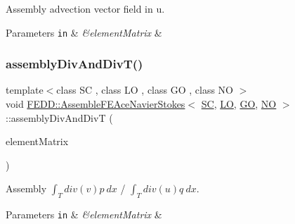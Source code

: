 Assembly advection vector field in u. 


\begin{DoxyParams}[1]{Parameters}
\mbox{\tt in}  & {\em \&element\+Matrix} & \\
\hline
\end{DoxyParams}
\mbox{\label{classFEDD_1_1AssembleFEAceNavierStokes_afec8907a0c90e42b5d0ceeb2509f3b31}} 
\subsubsection{\texorpdfstring{assembly\+Div\+And\+Div\+T()}{assemblyDivAndDivT()}}
{\footnotesize\ttfamily template$<$class SC , class LO , class GO , class NO $>$ \\
void \hyperlink{classFEDD_1_1AssembleFEAceNavierStokes}{F\+E\+D\+D\+::\+Assemble\+F\+E\+Ace\+Navier\+Stokes}$<$ \hyperlink{fe__test__laplace_8cpp_a79c7e86a57edbb2a5a53242bcd04e41e}{SC}, \hyperlink{fe__test__laplace_8cpp_ad6a38c9f07d3fd633eefca5bccad8410}{LO}, \hyperlink{fe__test__laplace_8cpp_afa2946b509009b4f45eb04bd8c5b27d9}{GO}, \hyperlink{fe__test__laplace_8cpp_a5e24f37b28787429872b6ecb1d0417ce}{NO} $>$\+::assembly\+Div\+And\+DivT (\begin{DoxyParamCaption}\item[{\hyperlink{classFEDD_1_1AssembleFE_afb5fb5dca3aab59f697a25884e99e894}{Small\+Matrix\+Ptr\+\_\+\+Type} \&}]{element\+Matrix }\end{DoxyParamCaption})\hspace{0.3cm}{\ttfamily [private]}}



Assembly $ \int_T div(v) p ~dx$ / $ \int_T div(u) q ~dx$. 


\begin{DoxyParams}[1]{Parameters}
\mbox{\tt in}  & {\em \&element\+Matrix} & \\
\hline
\end{DoxyParams}
\mbox{\label{classFEDD_1_1AssembleFEAceNavierStokes_ad66c0a9db00956e8df47d50d2e682403}} 
